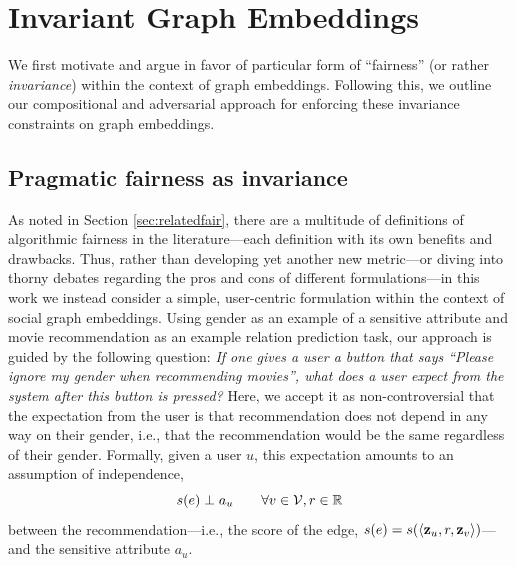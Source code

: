 \section{Invariant Graph Embeddings}

We first motivate and argue in favor of particular form of ``fairness'' (or rather {\em invariance}) within the context of graph embeddings.
Following this, we outline our compositional and adversarial approach for enforcing these invariance constraints on graph embeddings. 

\subsection{Pragmatic fairness as invariance}

As noted in Section \ref{sec:relatedfair}, there are a multitude of definitions of algorithmic fairness in the literature---each definition with its own benefits and drawbacks.
Thus, rather than developing yet another new metric---or diving into thorny debates regarding the pros and cons of different formulations---in this work we instead consider a simple, user-centric formulation within the context of social graph embeddings.
Using gender as an example of a sensitive attribute and movie recommendation as an example relation prediction task, our approach is guided by the following question: {\em If one gives a user a button that says ``Please ignore my gender when recommending movies'', what does a user expect from the system after this button is pressed?}
Here, we accept it as non-controversial that the expectation from the user is that recommendation does not depend in any way on their gender, i.e., that the recommendation would be the same regardless of their gender.
Formally, given a user $u$, this expectation amounts to an assumption of independence, 
\begin{equation}\label{eq:edgeind}
  s(e) \perp a_u \qquad \forall v \in \mathcal{V}, r \in \mathbb{R}
\end{equation}
between the recommendation---i.e., the score of the edge, $s(e) = s(\langle \mathbf{z}_u, r, \mathbf{z}_v\rangle)$---and the sensitive attribute $a_u$.

